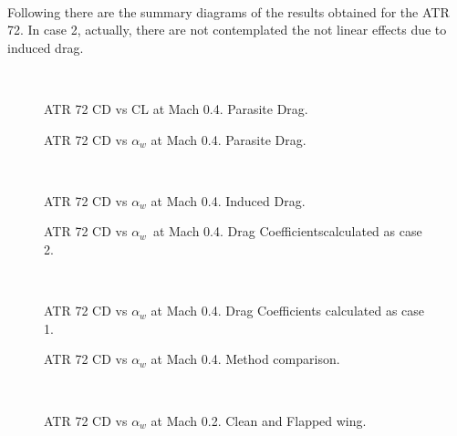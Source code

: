 \noindent \\

Following there are the summary diagrams of the results obtained for the ATR 72. In case 2, actually, there are not  contemplated the not linear effects due to induced drag.

\noindent \\




\begin{figure}[H]
\centering

\caption{ATR 72 CD vs CL at Mach 0.4. Parasite Drag.}
\label{fig:DragATR}
\end{figure}



\begin{figure}[H]
\centering

\caption{ATR 72 CD vs $\alpha_w$ at Mach 0.4. Parasite Drag.}
\label{fig:DragATR}
\end{figure}


\noindent \\

\begin{figure}[H]
\centering

\caption{ATR 72 CD vs $\alpha_w$ at Mach 0.4. Induced Drag.}
\label{fig:DragATR}
\end{figure}

\begin{figure}[H]
\centering

\caption{ATR 72 CD vs $\alpha_w$\  at Mach 0.4. Drag Coefficientscalculated as case 2.}
\label{fig:DragATR}
\end{figure}
\noindent \\
\begin{figure}[H]
\centering

\caption{ATR 72 CD vs $\alpha_w$  at Mach 0.4. Drag Coefficients calculated as case 1.}
\label{fig:DragATR}
\end{figure}

\begin{figure}[H]
\centering

\caption{ATR 72 CD vs $\alpha_w$  at Mach 0.4. Method comparison.}
\label{fig:DragATR}
\end{figure}

\noindent \\
\begin{figure}[H]
\centering

\caption{ATR 72 CD vs $\alpha_w$  at Mach 0.2. Clean and Flapped wing.}
\label{fig:DragATR}
\end{figure}




